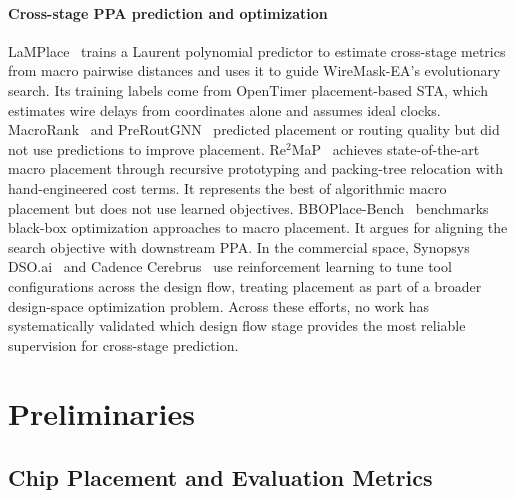 \documentclass[sigconf,anonymous,review,9pt]{acmart}
\begin{document}
\paragraph{Cross-stage PPA prediction and optimization}
LaMPlace~\cite{lamplace2025} trains a Laurent polynomial predictor to
estimate cross-stage metrics from macro pairwise distances and uses it
to guide WireMask-EA's evolutionary search. Its training labels come
from OpenTimer placement-based STA, which estimates wire delays from
coordinates alone and assumes ideal clocks.
MacroRank~\cite{macrorank2023} and
PreRoutGNN~\cite{preroutgnn2024} predicted placement or routing
quality but did not use predictions to improve placement.
Re$^2$MaP~\cite{re2map2025} achieves state-of-the-art macro placement
through recursive prototyping and packing-tree relocation with
hand-engineered cost terms. It represents the best of algorithmic
macro placement but does not use learned objectives.
BBOPlace-Bench~\cite{bboplacebench2025} benchmarks black-box
optimization approaches to macro placement. It argues for aligning
the search objective with downstream PPA. In the commercial space,
Synopsys DSO.ai~\cite{dsoai2025} and Cadence
Cerebrus~\cite{cerebrus2025} use reinforcement learning to tune tool
configurations across the design flow, treating placement as part of
a broader design-space optimization problem. Across these efforts, no
work has systematically validated which design flow stage provides the
most reliable supervision for cross-stage prediction.


\section{Preliminaries}
\label{sec:prelim}

\subsection{Chip Placement and Evaluation Metrics}
\end{document}
